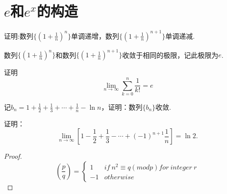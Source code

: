 	\section{$e$和$e^x$的构造}
	\begin{proposition}
		证明:数列$\{(1+\frac{1}{n})^n\}$单调递增，数列$\{(1+\frac{1}{n})^{n+1}\}$单调递减.
	\end{proposition}
	\begin{theorem}[e的构造]
		数列$\{(1+\frac{1}{n})^n\}$和数列$\{(1+\frac{1}{n})^{n+1}\}$收敛于相同的极限，记此极限为$e$.
	\end{theorem}
	\begin{example}
		证明$$\lim\limits_{n\rightarrow\infty}\sum_{k=0}^{n}\frac{1}{k!}=e$$
	\end{example}
	\begin{example}
		记$b_n=1+\frac{1}{2}+\frac{1}{3}+\cdots+\frac{1}{n}-\ln n$，证明：数列$\{b_n\}$收敛.
	\end{example}
	\begin{example}
		证明：$$\lim\limits_{n\rightarrow\infty}\left[1-\frac{1}{2}+\frac{1}{3}-\cdots+(-1)^{n+1}\frac{1}{n}\right]=\ln2.$$
	\end{example}
	\begin{proof}
		$$\left(\frac{p}{q}\right)=\left\{\begin{array}{rcl}1&if\ n^2\equiv q(mod p) for\ integer\ r\\-1&otherwise\end{array}\right.$$
	\end{proof}